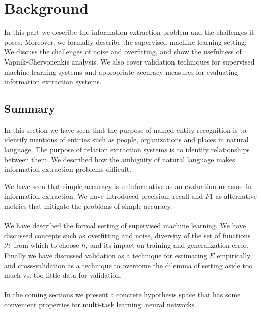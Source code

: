 \chapter{Background}
\label{background}

In this part we describe the information extraction problem and the challenges it poses. Moreover, we formally describe the supervised machine learning setting: We discuss the challenges of noise and overfitting, and show the usefulness of Vapnik-Chervonenkis analysis. We also cover validation techniques for supervised machine learning systems and appropriate accuracy measures for evaluating information extraction systems.




\section{Summary}
In this section we have seen that the purpose of named entity recognition is to identify mentions of entities such as people, organizations and places in natural language. The purpose of relation extraction systems is to identify relationships between them. We described how the ambiguity of natural language makes information extraction problems difficult.

We have seen that simple accuracy is uninformative as an evaluation measure in information extraction. We have introduced precision, recall and $F1$ as alternative metrics that mitigate the problems of simple accuracy.
\\\\
We have described the formal setting of supervised machine learning. We have discussed concepts such as overfitting and noise, diversity of the set of functions $\mathcal{H}$ from which to choose $h$, and its impact on training and generalization error. Finally we have discussed validation as a technique for estimating $E$ empirically, and cross-validation as a technique to overcome the dilemma of setting aside too much vs. too little data for validation. 
\\\\
In the coming sections we present a concrete hypothesis space that has some convenient properties for multi-task learning: neural networks.
